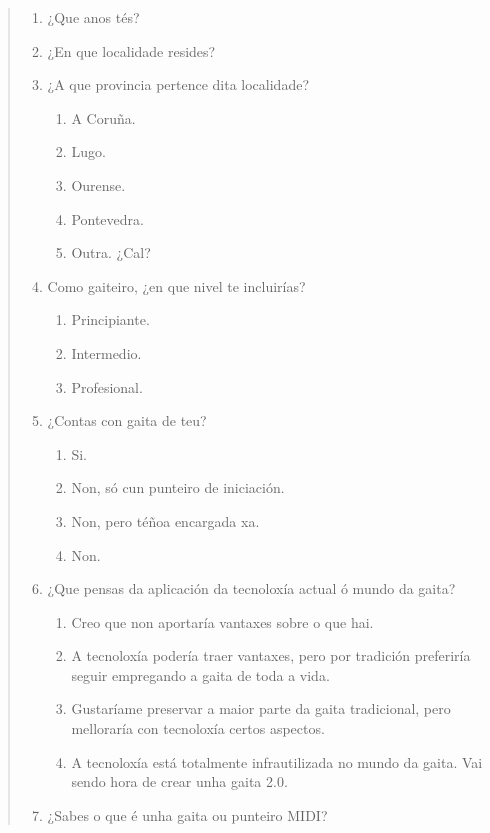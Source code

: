 \begin{quotation}
 \begin{enumerate}
  \item ¿Que anos tés?
  \item ¿En que localidade resides?
  \item ¿A que provincia pertence dita localidade?
        \begin{enumerate}
         \item A Coruña.
         \item Lugo.
         \item Ourense.
         \item Pontevedra.
         \item Outra. ¿Cal?
        \end{enumerate}
  \item Como gaiteiro, ¿en que nivel te incluirías?
        \begin{enumerate}
         \item Principiante.
         \item Intermedio.
         \item Profesional.
        \end{enumerate}
  \item ¿Contas con gaita de teu?
        \begin{enumerate}
         \item Si.
         \item Non, só cun punteiro de iniciación.
         \item Non, pero téñoa encargada xa.
         \item Non.
        \end{enumerate}
  \item ¿Que pensas da aplicación da tecnoloxía actual ó mundo da gaita?
        \begin{enumerate}
         \item Creo que non aportaría vantaxes sobre o que hai.
         \item A tecnoloxía podería traer vantaxes, pero por tradición
               preferiría seguir empregando a gaita de toda a vida.
         \item Gustaríame preservar a maior parte da gaita tradicional, pero
               melloraría con tecnoloxía certos aspectos.
         \item A tecnoloxía está totalmente infrautilizada no mundo da gaita.
               Vai sendo hora de crear unha gaita 2.0.
        \end{enumerate}
  \item ¿Sabes o que é unha gaita ou punteiro MIDI?

\end{enumerate}
\end{quotation}
